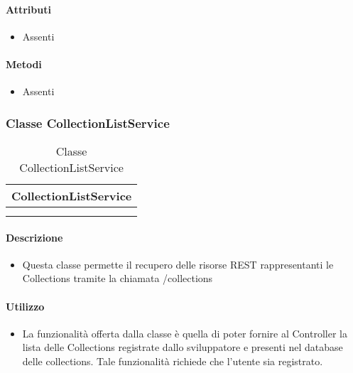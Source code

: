 \paragraph*{Attributi}
\begin{itemize}
\item[] Assenti
\end{itemize}

\paragraph*{Metodi}
\begin{itemize}
\item[] Assenti
\end{itemize}

\subsubsection{Classe CollectionListService}

\begin{table}[ht]
\begin{center}
\bgroup
\setlength{\arrayrulewidth}{0.6mm}
\def\arraystretch{1}
\begin{tabular}{ | p{12cm} | }
\hline
\centerline{\textbf{CollectionListService}}
\\ \hline
 \\ 
\hline
 \\ 
\hline
\end{tabular}
\egroup
\caption{Classe CollectionListService}
\end{center}
\end{table}

\paragraph*{Descrizione}
\begin{itemize}
\item[] Questa classe permette il recupero delle risorse REST rappresentanti le Collections tramite la chiamata /collections
\end{itemize}

\paragraph*{Utilizzo}
\begin{itemize}
\item[] La funzionalità offerta dalla classe è quella di poter fornire al Controller la lista delle Collections registrate dallo sviluppatore e presenti nel database delle collections.
Tale funzionalità richiede che l'utente sia registrato.
\end{itemize}

